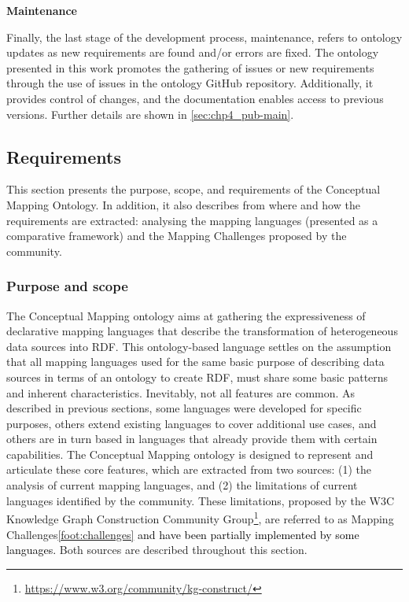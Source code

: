 \noindent\textbf{Maintenance}

Finally, the last stage of the development process, maintenance, refers to ontology updates as new requirements are found and/or errors are fixed. The ontology presented in this work promotes the gathering of issues or new requirements through the use of issues in the ontology GitHub repository. Additionally, it provides control of changes, and the documentation enables access to previous versions. Further details are shown in \cref{sec:chp4_pub-main}.



\subsection{Requirements}
\label{sec:chp4_requirements}

This section presents the purpose, scope, and requirements of the Conceptual Mapping Ontology. In addition, it also describes from where and how the requirements are extracted: analysing the mapping languages (presented as a comparative framework) and the Mapping Challenges proposed by the community. 

\subsubsection{Purpose and scope}

The Conceptual Mapping ontology aims at gathering the expressiveness of declarative mapping languages that describe the transformation of heterogeneous data sources into RDF. This ontology-based language settles on the assumption that all mapping languages used for the same basic purpose of describing data sources in terms of an ontology to create RDF, must share some basic patterns and inherent characteristics. Inevitably, not all features are common. As described in previous sections, some languages were developed for specific purposes, others extend existing languages to cover additional use cases, and others are in turn based in languages that already provide them with certain capabilities. The Conceptual Mapping ontology is designed to represent and articulate these core features, which are extracted from two sources: (1) the analysis of current mapping languages, and (2) the limitations of current languages identified by the community. These limitations, proposed by the W3C Knowledge Graph Construction Community Group\footnote{\label{foot:kgc}\url{https://www.w3.org/community/kg-construct/}}, are referred to as Mapping Challenges\cref{foot:challenges}  \textcolor{black}{and have been partially implemented by some languages.} Both sources are described throughout this section.

